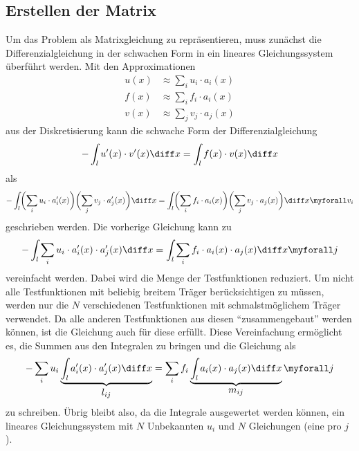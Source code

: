 \subsection{Erstellen der Matrix\label{fem:1d:matrix_erstellen}}
Um das Problem als Matrixgleichung zu repräsentieren, muss zunächst die Differenzialgleichung in der schwachen Form in ein lineares Gleichungssystem überführt werden.
Mit den Approximationen 
\begin{align}
    u(x) &\approx \sum_i u_i \cdot a_i(x) \\
    f(x) &\approx \sum_i f_i \cdot a_i(x) \\
    v(x) &\approx \sum_j v_j \cdot a_j(x)
\end{align}
aus der Diskretisierung kann die schwache Form der Differenzialgleichung 
\begin{equation}
    - \int_l u'(x) \cdot v'(x) \diff x = \int_l f(x) \cdot v(x) \diff x
\end{equation}
als
\begin{equation}
    - \int_l \biggl(\sum_i u_i \cdot a'_i(x)\biggr) \biggl(\sum_j v_j \cdot a'_j(x)\biggr) \diff x 
    = \int_l \biggl(\sum_i f_i \cdot a_i(x) \biggr) \biggl(\sum_j v_j \cdot a_j(x) \biggr) \diff x 
    \myforall v_i
\end{equation}
geschrieben werden.
Die vorherige Gleichung kann zu
\begin{equation}
    - \int_l \sum_i u_i \cdot a'_i(x) \cdot a'_j(x) \diff x = \int_l \sum_i f_i \cdot a_i(x) \cdot a_j(x) \diff x \myforall j
\end{equation}
vereinfacht werden.
Dabei wird die Menge der Testfunktionen reduziert.
Um nicht alle Testfunktionen mit beliebig breitem Träger berücksichtigen zu müssen, werden nur die $N$ verschiedenen Testfunktionen mit schmalstmöglichem Träger verwendet.
Da alle anderen Testfunktionen aus diesen ``zusammengebaut'' werden können, ist die Gleichung auch für diese erfüllt.
Diese Vereinfachung ermöglicht es, die Summen aus den Integralen zu bringen und die Gleichung als
\begin{equation}
    - \sum_i u_i \underbrace{\int_l a'_i(x) \cdot a'_j(x) \diff x}_{\displaystyle l_{ij}} = \sum_i f_i \underbrace{\int_l a_i(x) \cdot a_j(x) \diff x}_{\displaystyle m_{ij}} \myforall j \label{papers:fem:prinzip1d:finale_gleichung}
\end{equation}
zu schreiben.
Übrig bleibt also, da die Integrale ausgewertet werden können, ein lineares Gleichungssystem mit $N$ Unbekannten $u_i$ und $N$ Gleichungen (eine pro $j$). 

